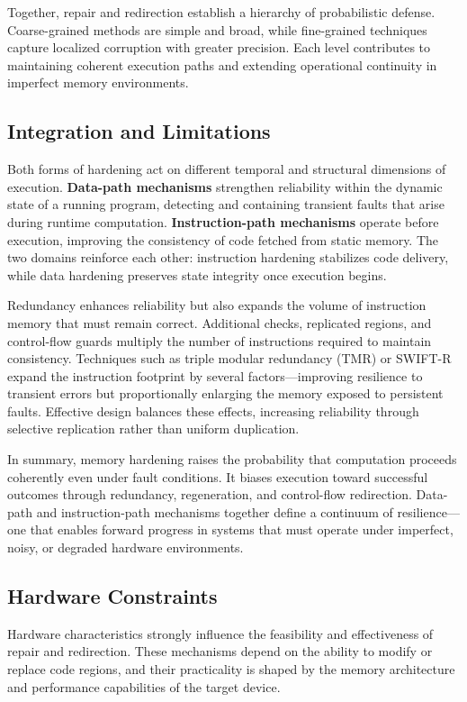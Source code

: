 Together, repair and redirection establish a hierarchy of probabilistic defense. Coarse-grained methods are simple and broad, while fine-grained techniques capture localized corruption with greater precision. Each level contributes to maintaining coherent execution paths and extending operational continuity in imperfect memory environments.

\subsection{Integration and Limitations}

Both forms of hardening act on different temporal and structural dimensions of execution. \textbf{Data-path mechanisms} strengthen reliability within the dynamic state of a running program, detecting and containing transient faults that arise during runtime computation. \textbf{Instruction-path mechanisms} operate before execution, improving the consistency of code fetched from static memory. The two domains reinforce each other: instruction hardening stabilizes code delivery, while data hardening preserves state integrity once execution begins.

Redundancy enhances reliability but also expands the volume of instruction memory that must remain correct. Additional checks, replicated regions, and control-flow guards multiply the number of instructions required to maintain consistency. Techniques such as triple modular redundancy (TMR) or SWIFT-R expand the instruction footprint by several factors—improving resilience to transient errors but proportionally enlarging the memory exposed to persistent faults. Effective design balances these effects, increasing reliability through selective replication rather than uniform duplication.

In summary, memory hardening raises the probability that computation proceeds coherently even under fault conditions. It biases execution toward successful outcomes through redundancy, regeneration, and control-flow redirection. Data-path and instruction-path mechanisms together define a continuum of resilience—one that enables forward progress in systems that must operate under imperfect, noisy, or degraded hardware environments.


\subsection{Hardware Constraints}

Hardware characteristics strongly influence the feasibility and effectiveness of repair and redirection. These mechanisms depend on the ability to modify or replace code regions, and their practicality is shaped by the memory architecture and performance capabilities of the target device.

